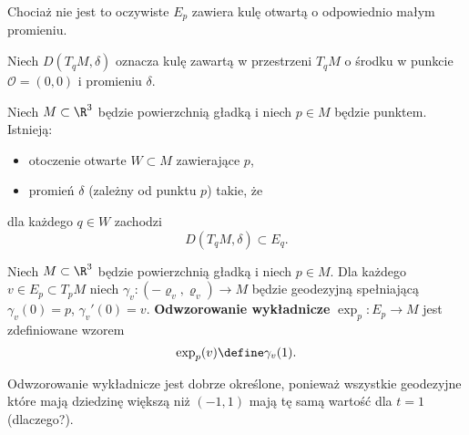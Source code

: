 \begin{frame}
 Chociaż nie jest to oczywiste $E_p$ zawiera kulę otwartą o odpowiednio małym promieniu. 

\pause Niech $D(T_qM,\delta)$ oznacza kulę zawartą w przestrzeni $T_qM$ o środku w punkcie $\mathcal{O}=(0,0)$ i promieniu $\delta$. 
\pause \begin{lemat}

\pause Niech $M\subset \R^3$ będzie powierzchnią gładką i niech $p\in M$ będzie punktem. Istnieją:
\begin{itemize}
\pause \item  otoczenie otwarte $W\subset M$ zawierające $p$,
\pause \item promień $\delta$ (zależny od punktu $p$) takie, że
\end{itemize}
dla każdego $q\in W$ zachodzi \[D(T_qM,\delta)\subset E_q.\]
\end{lemat}
\end{frame}
% 
% 
% 
% 
\begin{frame}

\begin{definicja}
Niech $M\subset \R^3$ będzie powierzchnią gładką i niech $p\in M$. Dla każdego $v\in E_p\subset T_pM$ niech $\gamma_v\colon(-\varrho_v,\varrho_v)\to M$ będzie geodezyjną spełniającą $\gamma_v(0)=p$, $\gamma_v'(0)=v$. \pause \textbf{Odwzorowanie wykładnicze} $\exp_p\colon E_p \to M$ jest zdefiniowane wzorem
\[\exp_p(v)\define\gamma_v(1).\]
\end{definicja}

\pause\begin{uwaga}
Odwzorowanie wykładnicze jest dobrze określone, ponieważ wszystkie geodezyjne które mają dziedzinę większą niż $(-1,1)$ mają tę samą wartość dla $t=1$ (dlaczego?).
\end{uwaga}

\end{frame}

